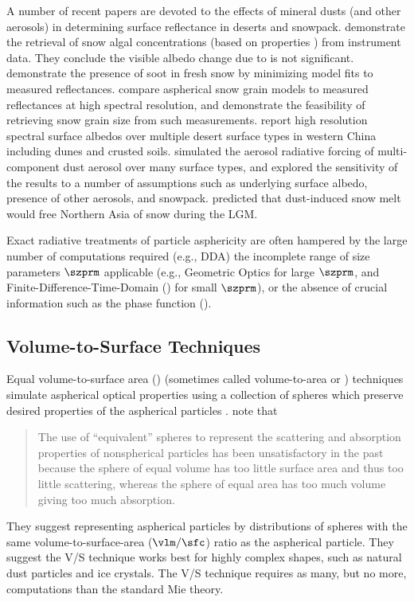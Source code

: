 \documentclass[12pt,twoside]{book}
\begin{document}
A number of recent papers are devoted to the effects of mineral
dusts (and other aerosols) in determining surface reflectance in
deserts and snowpack.
\cite{PDT01} demonstrate the retrieval of snow algal concentrations
(based on properties ) from
 instrument data.
They conclude the visible albedo change due to  is
not significant.
\cite{MAH05} demonstrate the presence of soot in fresh snow by
minimizing model fits to measured reflectances.
\cite{KAH05} compare aspherical snow grain models to measured
reflectances at high spectral resolution, and demonstrate the
feasibility of retrieving snow grain size from such measurements. 
\cite{AMY05} report high resolution spectral surface albedos over
multiple desert surface types in western China including dunes and
crusted soils.
\cite{ATU05} simulated the aerosol radiative forcing of
multi-component dust aerosol over many surface types, and explored the
sensitivity of the results to a number of assumptions such as
underlying surface albedo, presence of other aerosols, and snowpack.
\cite{KBB06} predicted that dust-induced snow melt would free Northern
Asia of snow during the LGM.

Exact radiative treatments of particle asphericity are often hampered 
by the large number of computations required (e.g., DDA) the
incomplete range of size parameters $\szprm$ applicable (e.g.,
Geometric Optics for large $\szprm$, and Finite-Difference-Time-Domain 
() for small $\szprm$), or the absence of crucial 
information such as the phase function ().

\subsection[Volume-to-Surface Techniques]{Volume-to-Surface Techniques}\label{sxn:vts}
Equal volume-to-surface area () (sometimes called
volume-to-area or ) techniques simulate aspherical optical
properties using a collection of spheres which preserve desired
properties of the aspherical particles \cite[]{GrW99,NGW03}.
\cite{GrW99} note that 
\begin{quote}
The use of ``equivalent'' spheres to represent
the scattering and absorption properties of nonspherical particles has
been unsatisfactory in the past because the sphere of equal volume has
too little surface area and thus too little scattering, whereas the
sphere of equal area has too much volume giving too much absorption.
\end{quote}
They suggest representing aspherical particles by distributions of
spheres with the same volume-to-surface-area ($\vlm/\sfc$) ratio as
the aspherical particle.
They suggest the V/S technique works best for highly complex shapes,
such as natural dust particles and ice crystals.
The V/S technique requires as many, but no more, computations than
the standard Mie theory. 
\end{document}
